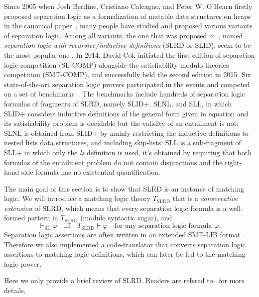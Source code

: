 \documentclass{article}
\theoremstyle{plain}
\begin{document}
Since 2005 when Josh Berdine, Cristiano Calcagno, and Peter W. O'Hearn firstly proposed separation logic as a formalization 
of mutable data structures on heaps in the canonical paper~\cite{SymbolicExecutionwithSeparationLogic}, many people 
have studied and proposed various variants of separation logic. 
Among all variants, the one that was proposed in~\cite{SeparationLogicwithRecursiveDefinitions}, named 
\emph{separation logic with recursive/inductive definitions} (SLRD or SLID), 
seem to be the most popular one \cite{SmallFoot}\cite{ShapeAnalysis}\cite{VeriFast}\cite{NaturalProof}\cite{SLReport}. 
In 2014, David Cok initiated the first edition of separation logic competition (SL-COMP) alongside the satisfiability modulo theories competition (SMT-COMP), and successfully held the second edition in 2015. 
Six state-of-the-art separation logic provers participated in the events and competed on a set of benchmarks~\cite{bench}. 
The benchmarks include hundreds of separation logic formulas of fragments of SLRD, namely SLID+, SLNL, and SLL, in which SLID+ considers inductive definitions of the general form given in equation and its satisfiability problem is decidable but the validity of an entailment is not; SLNL is obtained from SLID+ by mainly restricting the inductive definitions to nested lists data structures, and including skip-lists; SLL is a sub-fragment of SLL+ in which only the \textit{ls} definition is used, it's obtained by requiring that both formulas of the entailment problem do not contain disjunctions and the right-hand side formula has no existential quantification.

The main goal of this section is to show that SLRD is an instance of matching logic.
We will introduce a matching logic theory $T_{\text{SLRD}}$ that is a \emph{conservative extension} of SLRD, which means that every separation logic formula is a well-formed pattern in $T_{\text{SLRD}}$ (modulo syntactic sugar), and  
\begin{equation*}
\vdash_\text{SL} \varphi \quad \text{iff} \quad T_\text{SLRD} \vdash \varphi
\quad \text{for any separation logic formula $\varphi$.}
\end{equation*}
Separation logic assertions are often written in an extended SMT-LIB format~\cite{SMTLIB}. 
Therefore we also implemented a code-translator that converts separation logic assertions to matching logic definitions, which can later be fed to the matching logic prover. 

Here we only provide a brief review of SLRD. Readers are refered to~\cite{SeparationLogicwithRecursiveDefinitions} for more details.
\end{document}
